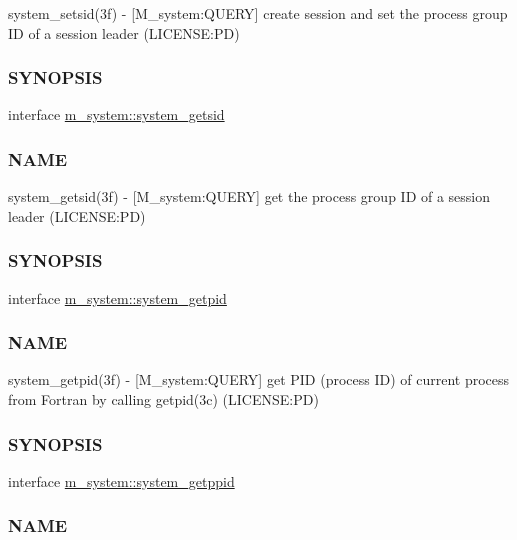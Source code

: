 \begin{DoxyCompactItemize}
\begin{DoxyCompactList}
system\+\_\+setsid(3f) -\/ \mbox{[}M\+\_\+system\+:Q\+U\+E\+RY\mbox{]} create session and set the process group ID of a session leader (L\+I\+C\+E\+N\+SE\+:PD) \subsubsection*{S\+Y\+N\+O\+P\+S\+IS}\end{DoxyCompactList}\item 
interface \mbox{\hyperlink{interfacem__system_1_1system__getsid}{m\+\_\+system\+::system\+\_\+getsid}}
\begin{DoxyCompactList}\small\item\em \subsubsection*{N\+A\+ME}

system\+\_\+getsid(3f) -\/ \mbox{[}M\+\_\+system\+:Q\+U\+E\+RY\mbox{]} get the process group ID of a session leader (L\+I\+C\+E\+N\+SE\+:PD) \subsubsection*{S\+Y\+N\+O\+P\+S\+IS}\end{DoxyCompactList}\item 
interface \mbox{\hyperlink{interfacem__system_1_1system__getpid}{m\+\_\+system\+::system\+\_\+getpid}}
\begin{DoxyCompactList}\small\item\em \subsubsection*{N\+A\+ME}

system\+\_\+getpid(3f) -\/ \mbox{[}M\+\_\+system\+:Q\+U\+E\+RY\mbox{]} get P\+ID (process ID) of current process from Fortran by calling getpid(3c) (L\+I\+C\+E\+N\+SE\+:PD) \subsubsection*{S\+Y\+N\+O\+P\+S\+IS}\end{DoxyCompactList}\item 
interface \mbox{\hyperlink{interfacem__system_1_1system__getppid}{m\+\_\+system\+::system\+\_\+getppid}}
\begin{DoxyCompactList}\small\item\em \subsubsection*{N\+A\+ME}


\end{DoxyCompactList}
\end{DoxyCompactItemize}
